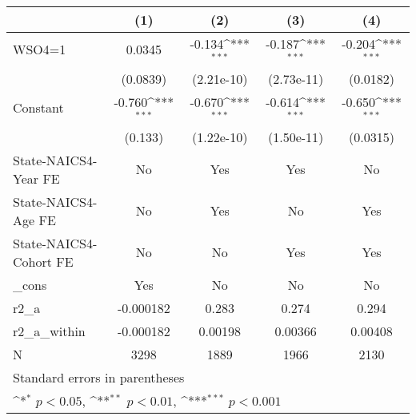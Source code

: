 {
\def\sym#1{\ifmmode^{#1}\else\(^{#1}\)\fi}
\begin{tabular}{l*{4}{c}}
\hline\hline
                    &\multicolumn{1}{c}{(1)}         &\multicolumn{1}{c}{(2)}         &\multicolumn{1}{c}{(3)}         &\multicolumn{1}{c}{(4)}         \\
\hline
WSO4=1              &      0.0345         &      -0.134\sym{***}&      -0.187\sym{***}&      -0.204\sym{***}\\
                    &    (0.0839)         &  (2.21e-10)         &  (2.73e-11)         &    (0.0182)         \\
[1em]
Constant            &      -0.760\sym{***}&      -0.670\sym{***}&      -0.614\sym{***}&      -0.650\sym{***}\\
                    &     (0.133)         &  (1.22e-10)         &  (1.50e-11)         &    (0.0315)         \\
[1em]
State-NAICS4-Year FE&          No         &         Yes         &         Yes         &          No         \\
[1em]
State-NAICS4-Age FE &          No         &         Yes         &          No         &         Yes         \\
[1em]
State-NAICS4-Cohort FE&          No         &          No         &         Yes         &         Yes         \\
[1em]
\_cons              &         Yes         &          No         &          No         &          No         \\
\hline
r2\_a                &   -0.000182         &       0.283         &       0.274         &       0.294         \\
r2\_a\_within         &   -0.000182         &     0.00198         &     0.00366         &     0.00408         \\
N                   &        3298         &        1889         &        1966         &        2130         \\
\hline\hline
\multicolumn{5}{l}{\footnotesize Standard errors in parentheses}\\
\multicolumn{5}{l}{\footnotesize \sym{*} \(p<0.05\), \sym{**} \(p<0.01\), \sym{***} \(p<0.001\)}\\
\end{tabular}
}
